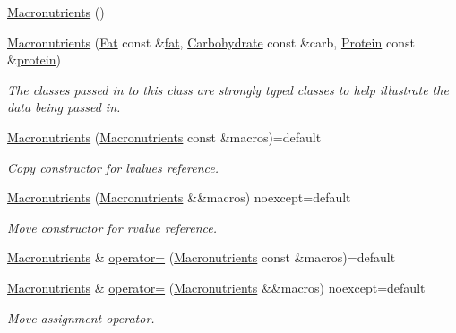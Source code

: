 \begin{DoxyCompactItemize}
\item 
\hyperlink{classfood_1_1_macronutrients_a41f7d2c1979da282b67824493d0905a6}{Macronutrients} ()
\item 
\hyperlink{classfood_1_1_macronutrients_afcb1c5e5380fbf25d1d0f9d3de17b335}{Macronutrients} (\hyperlink{structfood_1_1_fat}{Fat} const \&\hyperlink{classfood_1_1_macronutrients_aaf5c0f28fd6e7883c1536b44a415bb37}{fat}, \hyperlink{structfood_1_1_carbohydrate}{Carbohydrate} const \&carb, \hyperlink{structfood_1_1_protein}{Protein} const \&\hyperlink{classfood_1_1_macronutrients_a15a4120772455818fd7c088b99a2fae4}{protein})
\begin{DoxyCompactList}\small\item\em The classes passed in to this class are strongly typed classes to help illustrate the data being passed in. \end{DoxyCompactList}\item 
\hyperlink{classfood_1_1_macronutrients_adb6aeeac945e8dbd94734e967a6efc31}{Macronutrients} (\hyperlink{classfood_1_1_macronutrients}{Macronutrients} const \&macros)=default
\begin{DoxyCompactList}\small\item\em Copy constructor for lvalues reference. \end{DoxyCompactList}\item 
\hyperlink{classfood_1_1_macronutrients_af206f675652b58baa694078f9ad6ac27}{Macronutrients} (\hyperlink{classfood_1_1_macronutrients}{Macronutrients} \&\&macros) noexcept=default
\begin{DoxyCompactList}\small\item\em Move constructor for rvalue reference. \end{DoxyCompactList}\item 
\hyperlink{classfood_1_1_macronutrients}{Macronutrients} \& \hyperlink{classfood_1_1_macronutrients_a1da73b21a418ab85e806fdd83ec16316}{operator=} (\hyperlink{classfood_1_1_macronutrients}{Macronutrients} const \&macros)=default
\item 
\hyperlink{classfood_1_1_macronutrients}{Macronutrients} \& \hyperlink{classfood_1_1_macronutrients_a7c38fa08bff5787139cac7561cd902fd}{operator=} (\hyperlink{classfood_1_1_macronutrients}{Macronutrients} \&\&macros) noexcept=default
\begin{DoxyCompactList}\small\item\em Move assignment operator. \end{DoxyCompactList}\item 

\end{DoxyCompactItemize}
